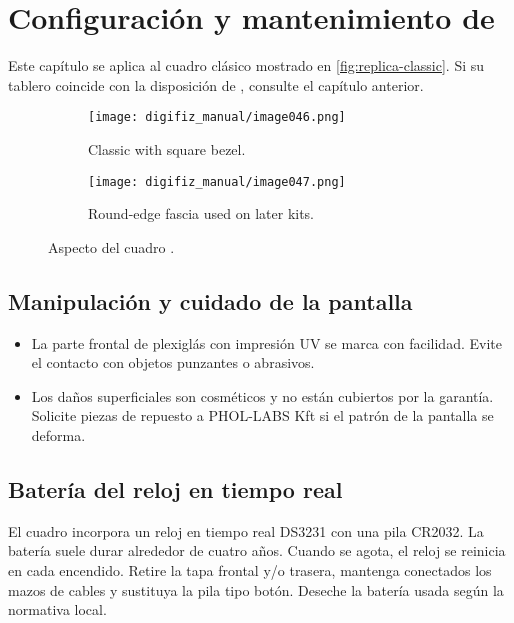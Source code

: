 \chapter{Configuración y mantenimiento de \ReplicaGenOne{}}\label{ch:replica-setup}

Este capítulo se aplica al cuadro clásico \ReplicaGenOne{} mostrado en \autoref{fig:replica-classic}. Si su tablero coincide con la disposición de \ReplicaNextLong{}, consulte el capítulo anterior.

\begin{figure}[htbp]
    \centering
    \begin{subfigure}{0.46\textwidth}
        \texttt{[image: digifiz\_manual/image046.png]}
        \caption{Classic \ReplicaGenOne{} with square bezel.}
    \end{subfigure}\hfill
    \begin{subfigure}{0.46\textwidth}
        \texttt{[image: digifiz\_manual/image047.png]}
        \caption{Round-edge fascia used on later kits.}
    \end{subfigure}
    \caption{Aspecto del cuadro \ReplicaGenOne{}.}
    \label{fig:replica-classic}
\end{figure}

\section{Manipulación y cuidado de la pantalla}
\begin{itemize}
    \item La parte frontal de plexiglás con impresión UV se marca con facilidad. Evite el contacto con objetos punzantes o abrasivos.
    \item Los daños superficiales son cosméticos y no están cubiertos por la garantía. Solicite piezas de repuesto a PHOL-LABS Kft si el patrón de la pantalla se deforma.
\end{itemize}

\section{Batería del reloj en tiempo real}
El cuadro incorpora un reloj en tiempo real DS3231 con una pila CR2032. La batería suele durar alrededor de cuatro años. Cuando se agota, el reloj se reinicia en cada encendido. Retire la tapa frontal y/o trasera, mantenga conectados los mazos de cables y sustituya la pila tipo botón. Deseche la batería usada según la normativa local.

